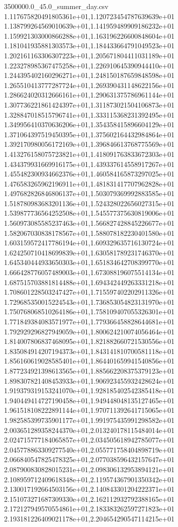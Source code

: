 \begin{filecontents*}{3500000.0_45.0_summer_day.csv}
1.117675820491805361e+01,1.120723454787639639e+01
1.138799264569010639e+01,1.141959489909186232e+01
1.159921303000866288e+01,1.163196226600848604e+01
1.181041935881303573e+01,1.184433664791049523e+01
1.202161163306307223e+01,1.205671804411031189e+01
1.223278985367475258e+01,1.226910645390944410e+01
1.244395402160296271e+01,1.248150187659848598e+01
1.265510413777287724e+01,1.269390431148622156e+01
1.286624020312666161e+01,1.290631375786961144e+01
1.307736221861424397e+01,1.311873021504106873e+01
1.328847018515796741e+01,1.333115368231392495e+01
1.349956410370636206e+01,1.354358415896604129e+01
1.371064397519450395e+01,1.375602164432984864e+01
1.392170980056172169e+01,1.396846613768775569e+01
1.413276158075723821e+01,1.418091763833672303e+01
1.434379931669916175e+01,1.439337614558917267e+01
1.455482300934662376e+01,1.460584165873297025e+01
1.476583265962196911e+01,1.481831417707962828e+01
1.497682826846806137e+01,1.503079369992883585e+01
1.518780983683201136e+01,1.524328022656027315e+01
1.539877736564252508e+01,1.545577375630819006e+01
1.560973085585237463e+01,1.566827428845226677e+01
1.582067030838178567e+01,1.588078182230401580e+01
1.603159572417786194e+01,1.609329635716130724e+01
1.624250710418699839e+01,1.630581789231746370e+01
1.645340444933650303e+01,1.651834642708399770e+01
1.666428776057489003e+01,1.673088196075514134e+01
1.687515703881814488e+01,1.694342449263331218e+01
1.708601228503247427e+01,1.715597402202911326e+01
1.729685350015224543e+01,1.736853054823131970e+01
1.750768068510264186e+01,1.758109407055326301e+01
1.771849384083571977e+01,1.779366458828644681e+01
1.792929296827949059e+01,1.800624210074056464e+01
1.814007806837468095e+01,1.821882660721530556e+01
1.835084914207194373e+01,1.843141810700581118e+01
1.856160619028585401e+01,1.864401659941540856e+01
1.877234921398613565e+01,1.885662208375379123e+01
1.898307821408453933e+01,1.906923455932428624e+01
1.919379319153241070e+01,1.928185402542385418e+01
1.940449414727190458e+01,1.949448048135127465e+01
1.961518108222891144e+01,1.970711392641715065e+01
1.982585399735901177e+01,1.991975435991298582e+01
2.003651289358244370e+01,2.013240178115484014e+01
2.024715777184065857e+01,2.034505618942785077e+01
2.045778863309277540e+01,2.055771758404898719e+01
2.066840547825478325e+01,2.077038596432157647e+01
2.087900830828015231e+01,2.098306132953894121e+01
2.108959712409618348e+01,2.119574367901350342e+01
2.130017192664503156e+01,2.140843301204222371e+01
2.151073271687309330e+01,2.162112932792388165e+01
2.172127949570554861e+01,2.183383262597271823e+01
2.193181226409021178e+01,2.204654290547114215e+01

\end{filecontents*}
